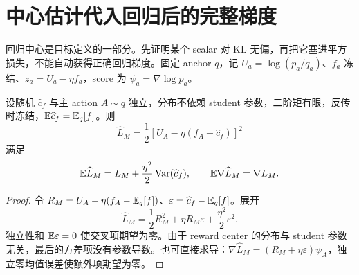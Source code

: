 \section{中心估计代入回归后的完整梯度}
\label{est:inner}

回归中心是目标定义的一部分。先证明某个 scalar 对 KL 无偏，再把它塞进平方损失，不能自动获得正确回归梯度。固定 anchor $q$，记 $U_a=\log(p_a/q_a)$、$f_a$ 冻结、$z_a=U_a-\eta f_a$，score 为 $\psi_a=\nabla\log p_a$。

\begin{proposition}
\label{est:mean-center}
设随机 $\widehat c_f$ 与主 action $A\sim q$ 独立，分布不依赖 student 参数，二阶矩有限，反传时冻结，$\mathbb E\widehat c_f=\mathbb E_q[f]$。则
\begin{equation}
\widehat L_M=\frac12[U_A-\eta(f_A-\widehat c_f)]^2
\end{equation}
满足
\begin{equation}
\mathbb E\widehat L_M=L_M+\frac{\eta^2}{2}\operatorname{Var}(\widehat c_f),\qquad
\mathbb E\nabla\widehat L_M=\nabla L_M.
\end{equation}
\end{proposition}
\begin{proof}
令 $R_M=U_A-\eta(f_A-\mathbb E_q[f])$、$\varepsilon=\widehat c_f-\mathbb E_q[f]$。展开
\begin{equation}
\widehat L_M=\frac12R_M^2+\eta R_M\varepsilon+\frac{\eta^2}{2}\varepsilon^2.
\end{equation}
独立性和 $\mathbb E\varepsilon=0$ 使交叉项期望为零。由于 reward center 的分布与 student 参数无关，最后的方差项没有参数导数。也可直接求导：$\nabla\widehat L_M=(R_M+\eta\varepsilon)\psi_A$，独立零均值误差使额外项期望为零。
\end{proof}

